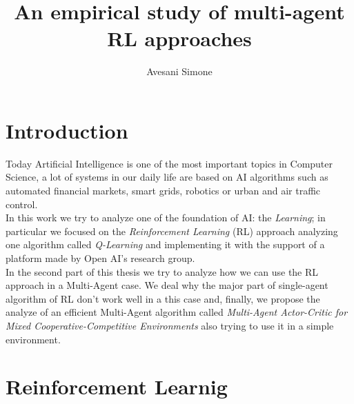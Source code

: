 \documentclass[]{report}
\title{An empirical study of multi-agent RL approaches}
\author{Avesani Simone}
\date{}
\begin{document}
\maketitle
\newpage
\tableofcontents
\newpage



\chapter{Introduction}
Today Artificial Intelligence is one of the most important topics in Computer Science, a lot of systems in our daily life are based on AI algorithms such as automated financial markets, smart grids, robotics or urban and air traffic control.\\
In this work we try to analyze one of the foundation of AI: the \emph{Learning}; in particular we focused on the \emph{Reinforcement Learning} (RL) approach analyzing one algorithm called \emph{Q-Learning} and implementing it with the support of a platform made by Open AI's research group.\\
In the second part of this thesis we try to analyze how we can use the RL approach in a Multi-Agent case. We deal why the major part of single-agent algorithm of RL don't work well in a this case and, finally, we propose the analyze of an efficient Multi-Agent algorithm called \emph{Multi-Agent Actor-Critic for Mixed Cooperative-Competitive Environments} also trying to use it in a simple environment.

\chapter{Reinforcement Learnig}\label{reinforcement-learnig}
\end{document}
